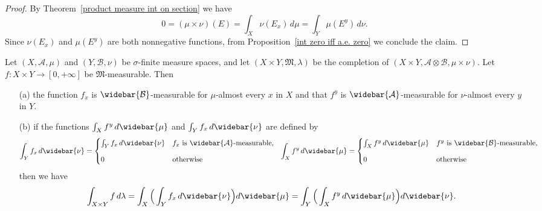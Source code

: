 \begin{proof}
By Theorem~\ref{product measure int on section} we have
\[0=(\mu\times\nu)(E)=\int_X\nu(E_x)\,d\mu=\int_Y\mu(E^y)\,d\nu.\]
Since $\nu(E_x)$ and $\mu(E^y)$ are both nonnegative functions, from Proposition~\ref{int zero iff a.e. zero} we conclude the claim.
\end{proof}
\begin{theorem}\label{Tonelli's theorem completion}
Let $(X,\mathcal{A},\mu)$ and $(Y,\mathcal{B},\nu)$ be $\sigma$-finite measure spaces, and let $(X\times Y,\mathfrak{M},\lambda)$ be the completion of $(X\times Y,\mathcal{A}\otimes\mathcal{B},\mu\times\nu)$. Let $f:X\times Y\to[0,+\infty]$ be $\mathfrak{M}$-measurable. Then
\begin{itemize}
\item[(a)] the function $f_x$ is $\widebar{\mathcal{B}}$-measurable for $\mu$-almost every $x$ in $X$ and that $f^y$ is $\widebar{\mathcal{A}}$-measurable for $\nu$-almost every $y$ in $Y$.
\item[(b)] if the functions $\int_Xf^y\,d\widebar{\mu}$ and $\int_Yf_x\,d\widebar{\nu}$ are defined by
\[\int_Yf_x\,d\widebar{\nu}=\begin{cases}
\int_Yf_x\,d\widebar{\nu}&\text{$f_x$ is $\widebar{\mathcal{A}}$-measurable},\\[8pt]
0&\text{otherwise}
\end{cases}\ \ \int_Xf^y\,d\widebar{\mu}=\begin{cases}
\int_Xf^y\,d\widebar{\mu}&\text{$f^y$ is $\widebar{\mathcal{B}}$-measurable},\\[8pt]
0&\text{otherwise}
\end{cases}\]
then we have
\[\int_{X\times Y}f\,d\lambda=\int_X\Big(\int_Yf_x\,d\widebar{\nu}\Big)d\widebar{\mu}=\int_Y\Big(\int_Xf^y\,d\widebar{\mu}\Big)d\widebar{\nu}.\]
\end{itemize}
\end{theorem}
